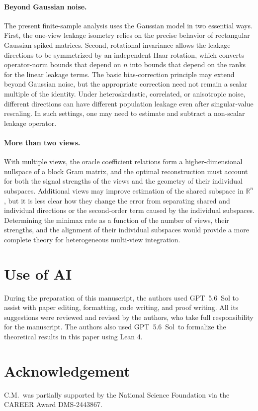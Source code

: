 \documentclass[11pt]{article}
\begin{document}
\paragraph{Beyond Gaussian noise.}
The present finite-sample analysis uses the Gaussian model in two essential
ways. First, the one-view leakage isometry relies on the precise behavior of
rectangular Gaussian spiked matrices. Second, rotational invariance allows the
leakage directions to be symmetrized by an independent Haar rotation, which
converts operator-norm bounds that depend on $n$ into bounds that depend on the
ranks for the linear leakage terms. The basic bias-correction principle may
extend beyond Gaussian noise, but the appropriate correction need not remain a
scalar multiple of the identity. Under heteroskedastic, correlated, or
anisotropic noise, different directions can have different population leakage
even after singular-value rescaling. In such settings, one may need to estimate
and subtract a non-scalar leakage operator.

\paragraph{More than two views.}
With multiple views, the oracle coefficient relations form a higher-dimensional
nullspace of a block Gram matrix, and the optimal reconstruction must account
for both the signal strengths of the views and the geometry of their individual
subspaces. Additional views may improve estimation of the shared subspace in
$\mathbb R^n$, but it is less clear how they change the error from separating
shared and individual directions or the second-order term caused by the
individual subspaces. Determining the minimax rate as a function of the number
of views, their strengths, and the alignment of their individual subspaces
would provide a more complete theory for heterogeneous multi-view integration.


\section*{Use of AI}
During the preparation of this manuscript, the authors used GPT~5.6~Sol to assist with paper editing, formatting, code writing, and proof writing. All its suggestions were reviewed and revised by the authors, who take full responsibility for the manuscript.
The authors also used GPT~5.6~Sol~to formalize the theoretical results in this paper using Lean 4.

\section*{Acknowledgement}
C.M.~was partially supported by the National Science Foundation via the CAREER
Award DMS-2443867. 
\end{document}
